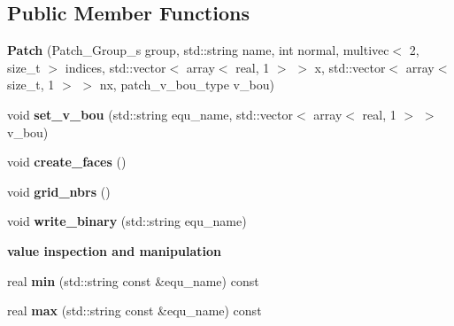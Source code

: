 \subsection*{Public Member Functions}
\begin{DoxyCompactItemize}
\item 
\hypertarget{classPatch_a74d349d49bdf800d6f7d6c31c7f39eb3}{{\bfseries Patch} (Patch\+\_\+\+Group\+\_\+s group, std\+::string name, int normal, multivec$<$ 2, size\+\_\+t $>$ indices, std\+::vector$<$ array$<$ real, 1 $>$ $>$ x, std\+::vector$<$ array$<$ size\+\_\+t, 1 $>$ $>$ nx, patch\+\_\+v\+\_\+bou\+\_\+type v\+\_\+bou)}\label{classPatch_a74d349d49bdf800d6f7d6c31c7f39eb3}

\item 
\hypertarget{classPatch_af0311eccfd4f4fd356785f7b23dc8fa2}{void {\bfseries set\+\_\+v\+\_\+bou} (std\+::string equ\+\_\+name, std\+::vector$<$ array$<$ real, 1 $>$ $>$ v\+\_\+bou)}\label{classPatch_af0311eccfd4f4fd356785f7b23dc8fa2}

\item 
\hypertarget{classPatch_a2af23d9c0ebbb60d35c24bb3fb582b64}{void {\bfseries create\+\_\+faces} ()}\label{classPatch_a2af23d9c0ebbb60d35c24bb3fb582b64}

\item 
\hypertarget{classPatch_ae57b4223cce6c1ed9dbaaa5080a2501a}{void {\bfseries grid\+\_\+nbrs} ()}\label{classPatch_ae57b4223cce6c1ed9dbaaa5080a2501a}

\item 
\hypertarget{classPatch_ae91999227e29d49f6f762b18e03fb5ac}{void {\bfseries write\+\_\+binary} (std\+::string equ\+\_\+name)}\label{classPatch_ae91999227e29d49f6f762b18e03fb5ac}

\end{DoxyCompactItemize}
\begin{Indent}{\bf value inspection and manipulation}\par
\begin{DoxyCompactItemize}
\item 
\hypertarget{classPatch_a08dda4968df785bc8a781eeed5132826}{real {\bfseries min} (std\+::string const \&equ\+\_\+name) const }\label{classPatch_a08dda4968df785bc8a781eeed5132826}

\item 
\hypertarget{classPatch_a8c5d72cafac1cb85958bd4190001ebd3}{real {\bfseries max} (std\+::string const \&equ\+\_\+name) const }\label{classPatch_a8c5d72cafac1cb85958bd4190001ebd3}

\end{DoxyCompactItemize}
\end{Indent}
